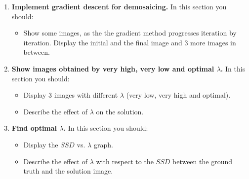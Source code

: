 \documentclass{paper}
\begin{document}
\begin{enumerate}
\item \textbf{Implement gradient descent for demosaicing.} In this section you should:

\begin{itemize}
\item Show some images, as the the gradient method progresses iteration by iteration. Display the initial and the final image and 3 more images in between.
\end{itemize}

\item \textbf{Show images obtained by very high, very low and optimal $\lambda$.} In this section you should:

\begin{itemize}
\item Display 3 images with different $\lambda$ (very low, very high and optimal).
\item Describe the effect of $\lambda$ on the solution.
\end{itemize}

\item \textbf{ Find optimal $\lambda$.} In this section you should:

\begin{itemize}
\item Display the $SSD$ vs. $\lambda$ graph.
\item Describe the effect of $\lambda$ with respect to the $SSD$ between the ground truth and the solution image.
\end{itemize}


\end{enumerate}


 
\end{document}
